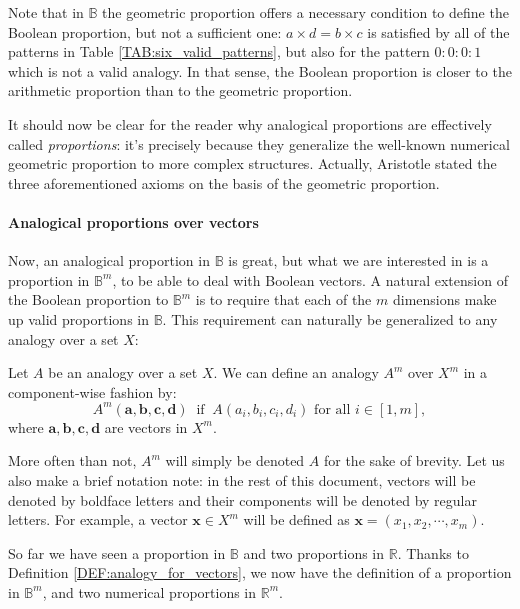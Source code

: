 Note that in $\mathbb{B}$ the geometric proportion offers a necessary condition
to define the Boolean proportion, but not a sufficient one: $a \times d =
b\times c$ is satisfied by all of the patterns in Table
\ref{TAB:six_valid_patterns}, but also for the pattern $0: 0: 0: 1$ which is
not a valid analogy. In that sense, the Boolean proportion is closer to the
arithmetic proportion than to the geometric proportion.

It should now be clear for the reader why analogical proportions are
effectively called \textit{proportions}: it's precisely because they generalize
the well-known numerical geometric proportion to more complex structures.
Actually, Aristotle stated the three aforementioned axioms on the basis of the
geometric proportion.

\paragraph{Analogical proportions over vectors\\}

Now, an analogical proportion in $\mathbb{B}$ is great, but what we are
interested in is a proportion in $\mathbb{B}^m$, to be able to deal with
Boolean vectors. A natural extension of the Boolean proportion to
$\mathbb{B}^m$ is to require that each of the $m$ dimensions make up valid
proportions in $\mathbb{B}$. This requirement can naturally be generalized to
any analogy over a set $X$:

\begin{definition}
  \label{DEF:analogy_for_vectors}
  Let $A$ be an analogy over a set $X$. We can define an analogy $A^m$ over
  $X^m$ in a component-wise fashion by:
  $$A^m(\mathbf{a}, \mathbf{b}, \mathbf{c}, \mathbf{d}) ~ \text{  if  } ~
  A(a_i, b_i, c_i, d_i) \text{ for all } i \in [1, m],$$
  where $\mathbf{a}, \mathbf{b}, \mathbf{c}, \mathbf{d}$ are vectors in $X^m$.
\end{definition}
\noindent
More often than not, $A^m$ will simply be denoted $A$ for the sake of brevity.
Let us also make a brief notation note: in the rest of this document, vectors
will be denoted by boldface letters and their components will be denoted by
regular letters. For example, a vector $\mathbf{x} \in X^m$ will be defined as
$\mathbf{x} = (x_1, x_2, \cdots, x_m)$.

So far we have seen a proportion in $\mathbb{B}$ and two proportions in
$\mathbb{R}$. Thanks to Definition \ref{DEF:analogy_for_vectors}, we now have
the definition of a proportion in $\mathbb{B}^m$, and two numerical proportions
in $\mathbb{R}^m$.

